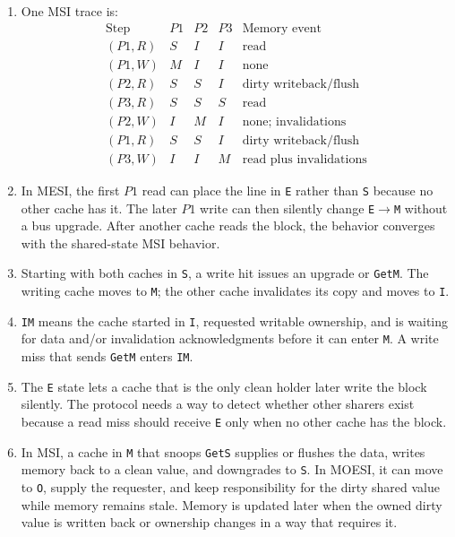 \documentclass[11pt]{article}
\begin{document}
\begin{enumerate}
    \item One MSI trace is:
    \[
    \begin{array}{c|c|c|c|c}
        \text{Step} & P1 & P2 & P3 & \text{Memory event}\\
        \hline
        (P1,R) & S & I & I & \text{read}\\
        (P1,W) & M & I & I & \text{none}\\
        (P2,R) & S & S & I & \text{dirty writeback/flush}\\
        (P3,R) & S & S & S & \text{read}\\
        (P2,W) & I & M & I & \text{none; invalidations}\\
        (P1,R) & S & S & I & \text{dirty writeback/flush}\\
        (P3,W) & I & I & M & \text{read plus invalidations}
    \end{array}
    \]

    \item In MESI, the first \(P1\) read can place the line in \texttt{E} rather than \texttt{S} because no other cache has it.
    The later \(P1\) write can then silently change \texttt{E}\(\rightarrow\)\texttt{M} without a bus upgrade.
    After another cache reads the block, the behavior converges with the shared-state MSI behavior.

    \item Starting with both caches in \texttt{S}, a write hit issues an upgrade or \texttt{GetM}.
    The writing cache moves to \texttt{M}; the other cache invalidates its copy and moves to \texttt{I}.

    \item \texttt{IM} means the cache started in \texttt{I}, requested writable ownership, and is waiting for data and/or invalidation acknowledgments before it can enter \texttt{M}.
    A write miss that sends \texttt{GetM} enters \texttt{IM}.

    \item The \texttt{E} state lets a cache that is the only clean holder later write the block silently.
    The protocol needs a way to detect whether other sharers exist because a read miss should receive \texttt{E} only when no other cache has the block.

    \item In MSI, a cache in \texttt{M} that snoops \texttt{GetS} supplies or flushes the data, writes memory back to a clean value, and downgrades to \texttt{S}.
    In MOESI, it can move to \texttt{O}, supply the requester, and keep responsibility for the dirty shared value while memory remains stale.
    Memory is updated later when the owned dirty value is written back or ownership changes in a way that requires it.


\end{enumerate}
\end{document}
